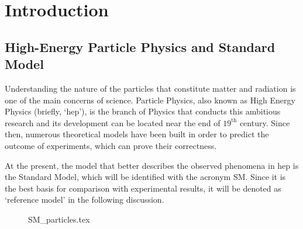 \mainmatter
\chapter{Introduction}
\label{chap:Introduction}





\section{High-Energy Particle Physics and Standard Model}
Understanding the nature of the particles that constitute matter and radiation is one of the main concerns of science. Particle Physics, also known as High Energy Physics (briefly, `hep'), is the branch of Physics that conducts this ambitious research and its development can be located near the end of $19^\mathrm{th}$ century. Since then, numerous theoretical models have been built in order to predict the outcome of experiments, which can prove their correctness.

At the present, the model that better describes the observed phenomena in hep is the Standard Model, which will be identified with the acronym SM. Since it is the best basis for comparison with experimental results, it will be denoted as `reference model' in the following discussion.

\begin{figure}[H]
	\centering
	{SM_particles.tex}
	\label{fig:SM_PARTICLES}
\end{figure}

